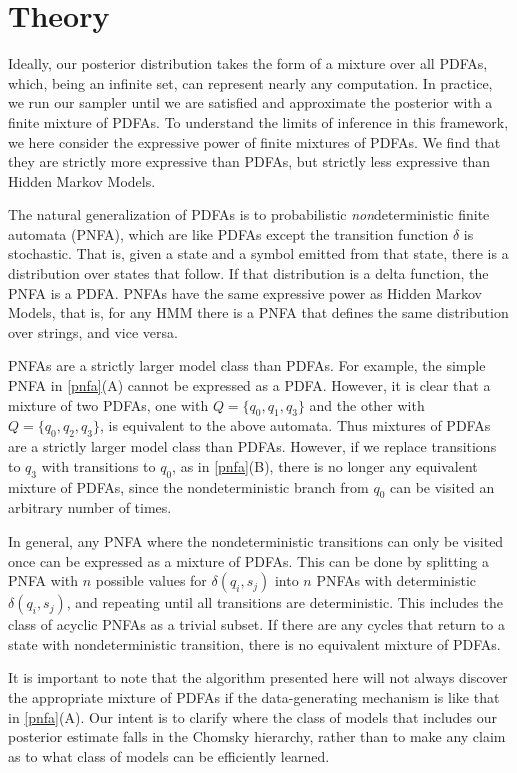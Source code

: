 \section{Theory}
\label{theory}

Ideally, our posterior distribution takes the form of a mixture over all PDFAs, which, being an infinite set, can represent nearly any computation.  In practice, we run our sampler until we are satisfied and approximate the posterior with a finite mixture of PDFAs.  To understand the limits of inference in this framework, we here consider the expressive power of finite mixtures of PDFAs.  We find that they are strictly more expressive than PDFAs, but strictly less expressive than Hidden Markov Models.

The natural generalization of PDFAs is to probabilistic {\em non}deterministic finite automata (PNFA), which are like PDFAs except the transition function $\delta$ is stochastic.  That is, given a state and a symbol emitted from that state, there is a distribution over states that follow.  If that distribution is a delta function, the PNFA is a PDFA.  PNFAs have the same expressive power as Hidden Markov Models, that is, for any HMM there is a PNFA that defines the same distribution over strings, and vice versa.

PNFAs are a strictly larger model class than PDFAs.  For example, the simple PNFA in \ref{pnfa}(A) cannot be expressed as a PDFA.  However, it is clear that a mixture of two PDFAs, one with $Q = \{q_0,q_1,q_3\}$ and the other with $Q = \{q_0,q_2,q_3\}$, is equivalent to the above automata.  Thus mixtures of PDFAs are a strictly larger model class than PDFAs.  However, if we replace transitions to $q_3$ with transitions to $q_0$, as in \ref{pnfa}(B), there is no longer any equivalent mixture of PDFAs, since the nondeterministic branch from $q_0$ can be visited an arbitrary number of times.

In general, any PNFA where the nondeterministic transitions can only be visited once can be expressed as a mixture of PDFAs.  This can be done by splitting a PNFA with $n$ possible values for $\delta(q_i,s_j)$ into $n$ PNFAs with deterministic $\delta(q_i,s_j)$, and repeating until all transitions are deterministic.  This includes the class of acyclic PNFAs as a trivial subset.  If there are any cycles that return to a state with nondeterministic transition, there is no equivalent mixture of PDFAs.

It is important to note that the algorithm presented here will not always discover the appropriate mixture of PDFAs if the data-generating mechanism is like that in \ref{pnfa}(A).  Our intent is to clarify where the class of models that includes our posterior estimate falls in the Chomsky hierarchy, rather than to make any claim as to what class of models can be efficiently learned.

